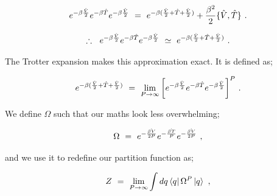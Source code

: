 \documentclass{article}
\begin{document}
\begin{equation} \label{eq:1}
e^{-\beta \frac{\hat{V}}{2}} e^{-\beta \hat{T}} e^{-\beta \frac{\hat{V}}{2}} \hspace{0.125cm} = \hspace{0.125cm} e^{-\beta ( \frac{\hat{V}}{2} + \hat{T} + \frac{\hat{V}}{2} )} + \frac{\beta^2}{2} \{ \hat{V} , \hat{T} \}  \hspace{0.125cm} .
\end{equation}

\begin{equation} \label{eq:1}
\therefore  \hspace{0.225cm}  e^{-\beta \frac{\hat{V}}{2}} e^{-\beta \hat{T}} e^{-\beta \frac{\hat{V}}{2}} \hspace{0.125cm} \simeq \hspace{0.125cm} e^{-\beta ( \frac{\hat{V}}{2} + \hat{T} + \frac{\hat{V}}{2} )} \hspace{0.125cm} .
\end{equation}

The Trotter expansion makes this approximation exact. It is defined as;

\begin{equation} \label{eq:1}
e^{-\beta ( \frac{\hat{V}}{2} + \hat{T} + \frac{\hat{V}}{2} )} \hspace{0.125cm} = \hspace{0.125cm} \lim_{P \rightarrow \infty} \bigg[ e^{-\beta \frac{\hat{V}}{2}} e^{-\beta \hat{T}} e^{-\beta \frac{\hat{V}}{2}} \bigg]^P \hspace{0.125cm} .  
\end{equation}

We define \begin{math} \Omega \end{math} such that our maths look less overwhelming;

\begin{equation} \label{eq:1}
\Omega \hspace{0.125cm} = \hspace{0.125cm} e^{-\frac{\hat{\beta V}}{2 P}} e^{- \frac{\hat{\beta T}}{P}} e^{- \frac{\hat{\beta V}}{2 P}} \hspace{0.125cm} , 
\end{equation}

and we use it to redefine our partition function as;

\begin{equation} \label{eq:1}
Z \hspace{0.125cm} = \hspace{0.125cm}  \lim_{P \rightarrow \infty} \int dq \bra{q} \Omega^P \ket{q} \hspace{0.125cm} , 
\end{equation}
\end{document}
